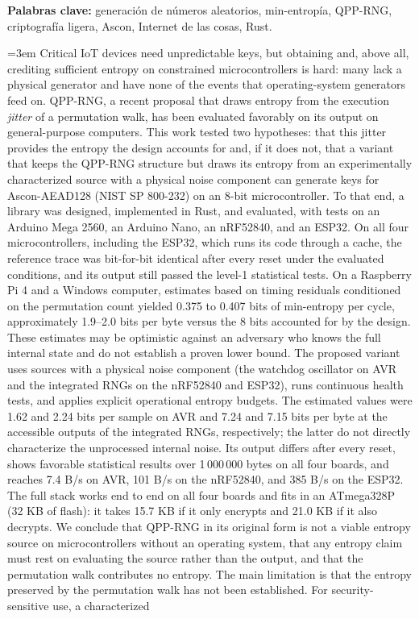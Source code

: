 \documentclass{plantilla-uniandes}
\begin{document}
\textbf{Palabras clave:} generación de números aleatorios, min-entropía, QPP-RNG, criptografía ligera, Ascon, Internet de las cosas, Rust.


\clearpage
{}

\begingroup
{}  \emergencystretch=3em
Critical IoT devices need unpredictable keys, but obtaining and, above all, crediting sufficient entropy on constrained microcontrollers is hard: many lack a physical generator and have none of the events that operating-system generators feed on. QPP-RNG, a recent proposal that draws entropy from the execution \textit{jitter} of a permutation walk, has been evaluated favorably on its output on general-purpose computers. This work tested two hypotheses: that this jitter provides the entropy the design accounts for and, if it does not, that a variant that keeps the QPP-RNG structure but draws its entropy from an experimentally characterized source with a physical noise component can generate keys for Ascon-AEAD128 (NIST SP 800-232) on an 8-bit microcontroller. To that end, a library was designed, implemented in Rust, and evaluated, with tests on an Arduino Mega 2560, an Arduino Nano, an nRF52840, and an ESP32. On all four microcontrollers, including the ESP32, which runs its code through a cache, the reference trace was bit-for-bit identical after every reset under the evaluated conditions, and its output still passed the level-1 statistical tests. On a Raspberry Pi 4 and a Windows computer, estimates based on timing residuals conditioned on the permutation count yielded 0.375 to 0.407 bits of min-entropy per cycle, approximately 1.9--2.0 bits per byte versus the 8 bits accounted for by the design. These estimates may be optimistic against an adversary who knows the full internal state and do not establish a proven lower bound. The proposed variant uses sources with a physical noise component (the watchdog oscillator on AVR and the integrated RNGs on the nRF52840 and ESP32), runs continuous health tests, and applies explicit operational entropy budgets. The estimated values were 1.62 and 2.24 bits per sample on AVR and 7.24 and 7.15 bits per byte at the accessible outputs of the integrated RNGs, respectively; the latter do not directly characterize the unprocessed internal noise. Its output differs after every reset, shows favorable statistical results over 1\,000\,000 bytes on all four boards, and reaches 7.4 B/s on AVR, 101 B/s on the nRF52840, and 385 B/s on the ESP32. The full stack works end to end on all four boards and fits in an ATmega328P (32 KB of flash): it takes 15.7 KB if it only encrypts and 21.0 KB if it also decrypts. We conclude that QPP-RNG in its original form is not a viable entropy source on microcontrollers without an operating system, that any entropy claim must rest on evaluating the source rather than the output, and that the permutation walk contributes no entropy. The main limitation is that the entropy preserved by the permutation walk has not been established. For security-sensitive use, a characterized 
\end{document}
